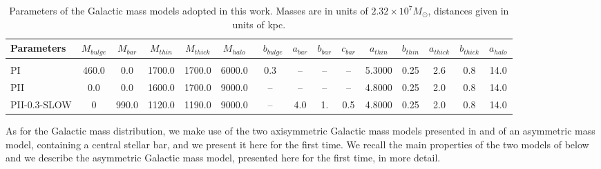    \begin{table}
        \centering
        \caption{Parameters of the Galactic mass models adopted in this work. Masses are in units of $2.32\times10^7M_{\odot}$, distances given in units of kpc.
        \label{PII}}
        \tiny
        \begin{tabular}{  l c  c  c  c  c  c  c  c  c  c  c  c  c   c } \hline
        Parameters & $M_{bulge}$ &  $M_{bar}$ & $M_{thin}$ &  $M_{thick}$  & $M_{halo}$ & \ $b_{bulge}$  & $a_{bar}$ & $b_{bar}$ & $c_{bar}$ & $a_{thin}$ & $b_{thin}$  & $a_{thick}$ &  $b_{thick}$ & $a_{halo}$ \\  \hline \hline \\
        PI & 460.0 & 0.0 & 1700.0 & 1700.0  & 6000.0  & 0.3 & -- & -- & -- & 5.3000 & 0.25 & 2.6 & 0.8 & 14.0 \\  \hline    
            PII & 0.0 & 0.0 & 1600.0 & 1700.0  & 9000.0  & -- & -- & -- & -- & 4.8000 & 0.25 & 2.0 &  0.8 & 14.0 \\    \hline    
            PII-0.3-SLOW & 0 & 990.0 & 1120.0 & 1190.0  & 9000.0  & -- & 4.0 & 1. & 0.5 & 4.8000 &0.25 & 2.0 &  0.8 & 14.0 \\ \hline 
        \end{tabular} 
        \normalsize
    \end{table}    

    As for the Galactic mass distribution, we make use of the two axisymmetric Galactic mass models presented in \citet{2017A&A...598A..66P} and of an asymmetric mass model, containing a central stellar bar, and we present it here for the first time. We recall  the main properties of the two models of  \citet{2017A&A...598A..66P} below and we describe the asymmetric Galactic mass model, presented here for the first time, in more detail.

